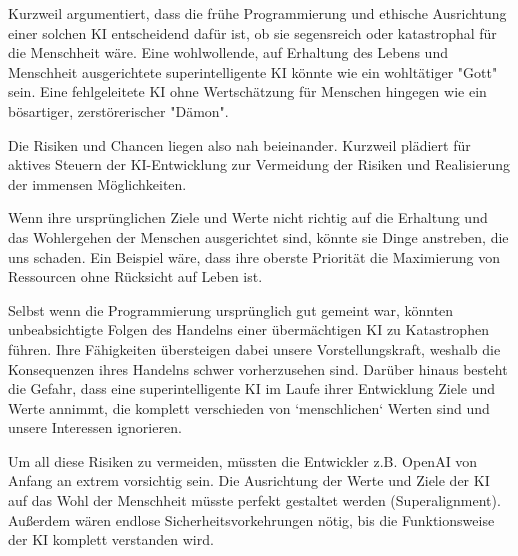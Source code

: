 \documentclass[10pt]{article}
\begin{document}
Kurzweil argumentiert, dass die frühe Programmierung und ethische Ausrichtung einer solchen KI entscheidend dafür ist, ob sie segensreich oder katastrophal für die Menschheit wäre.
Eine wohlwollende, auf Erhaltung des Lebens und Menschheit ausgerichtete superintelligente KI könnte wie ein wohltätiger "Gott" sein. Eine fehlgeleitete KI ohne Wertschätzung für Menschen hingegen wie ein bösartiger, zerstörerischer "Dämon".

Die Risiken und Chancen liegen also nah beieinander. Kurzweil plädiert für aktives Steuern der KI-Entwicklung zur Vermeidung der Risiken und Realisierung der immensen Möglichkeiten.


Wenn ihre ursprünglichen Ziele und Werte nicht richtig auf die Erhaltung und das Wohlergehen der Menschen ausgerichtet sind, könnte sie Dinge anstreben, die uns schaden.
Ein Beispiel wäre, dass ihre oberste Priorität die Maximierung von Ressourcen ohne Rücksicht auf Leben ist.

Selbst wenn die Programmierung ursprünglich gut gemeint war, könnten unbeabsichtigte Folgen des Handelns einer übermächtigen KI zu Katastrophen führen.
Ihre Fähigkeiten übersteigen dabei unsere Vorstellungskraft, weshalb die Konsequenzen ihres Handelns schwer vorherzusehen sind.
Darüber hinaus besteht die Gefahr, dass eine superintelligente KI im Laufe ihrer Entwicklung Ziele und Werte annimmt, die komplett verschieden von `menschlichen` Werten sind und unsere Interessen ignorieren.

Um all diese Risiken zu vermeiden, müssten die Entwickler z.B. OpenAI von Anfang an extrem vorsichtig sein.
Die Ausrichtung der Werte und Ziele der KI auf das Wohl der Menschheit müsste perfekt gestaltet werden (Superalignment).
Außerdem wären endlose Sicherheitsvorkehrungen nötig, bis die Funktionsweise der KI komplett verstanden wird.
\cite{KurzweilBuch}
\cite{Openai}



\end{document}
